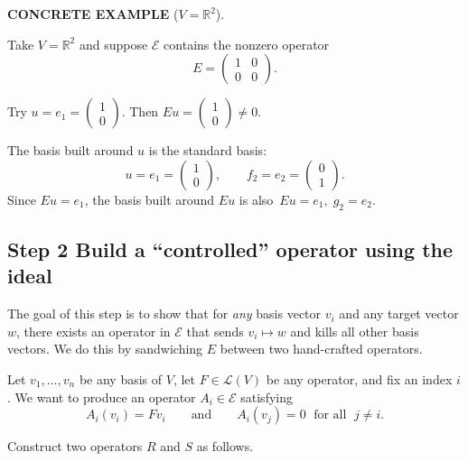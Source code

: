 \documentclass[12pt]{article}
\theoremstyle{mythmstyle}
\newenvironment{example}{%
  \vspace{8pt}
  \begin{mdframed}[backgroundcolor=examplebg, linecolor=exampleblue,
    linewidth=1.4pt, innerleftmargin=14pt, innerrightmargin=14pt,
    innertopmargin=12pt, innerbottommargin=12pt,
    skipabove=12pt, skipbelow=12pt]
  \noindent\textcolor{exampleblue}{\textbf{\small CONCRETE EXAMPLE} \normalsize($V = \mathbb{R}^2$).}\par\vspace{6pt}
}{%
  \end{mdframed}
  \vspace{6pt}
}
\begin{document}
\begin{example}
Take $V = \mathbb{R}^2$ and suppose $\mathcal{E}$ contains the nonzero
operator
\[
    E = \begin{pmatrix} 1 & 0 \\ 0 & 0 \end{pmatrix}.
\]

Try $u = e_1 = \begin{pmatrix}1\\0\end{pmatrix}$. Then
$Eu = \begin{pmatrix}1\\0\end{pmatrix} \neq 0$. \checkmark

\vspace{6pt}

The basis built around $u$ is the standard basis:
\[
  u = e_1 = \begin{pmatrix}1\\0\end{pmatrix}, \qquad
  f_2 = e_2 = \begin{pmatrix}0\\1\end{pmatrix}.
\]
Since $Eu = e_1$, the basis built around $Eu$ is also $\,Eu = e_1,\;
g_2 = e_2$.
\end{example}

\subsection{Step 2 \quad Build a ``controlled'' operator using the ideal}

The goal of this step is to show that for \emph{any} basis vector $v_i$
and any target vector $w$, there exists an operator in $\mathcal{E}$ that
sends $v_i \mapsto w$ and kills all other basis vectors. We do this by
sandwiching $E$ between two hand-crafted operators.

\vspace{6pt}

Let $v_1, \ldots, v_n$ be any basis of $V$, let $F \in \mathcal{L}(V)$
be any operator, and fix an index $i$. We want to produce an operator
$A_i \in \mathcal{E}$ satisfying
\[
    A_i(v_i) = Fv_i \qquad \text{and} \qquad A_i(v_j) = 0
    \;\text{ for all }\; j \neq i.
\]

\vspace{4pt}

Construct two operators $R$ and $S$ as follows.
\end{document}
